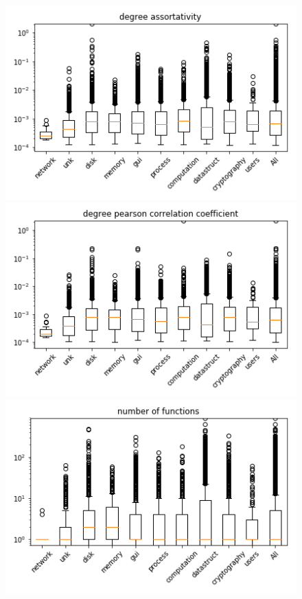 \begin{appendices}
\begin{figure}[H]
\vfill


%
\centering
\includegraphics[width=0.9\linewidth]{img/boxplots/v1_unbalanced_degree_assortativity.png}
\endminipage
{}%
\centering
\includegraphics[width=0.9\linewidth]{img/boxplots/v1_unbalanced_degree_pearson_correlation_coefficient.png}
\endminipage
{}%
\centering
\includegraphics[width=0.9\linewidth]{img/boxplots/v1_unbalanced_number_of_functions.png}
\endminipage


\end{figure}
\end{appendices}
